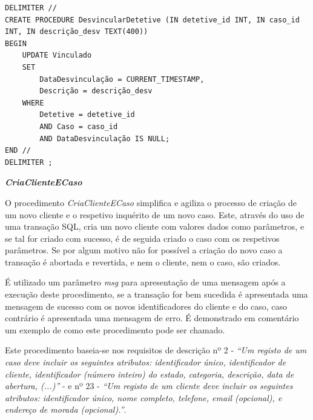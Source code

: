 \documentclass[a4paper,12pt]{scrreprt}
\begin{document}
\vspace{0.4cm}
\begin{lstlisting}[escapechar=!]
DELIMITER //
CREATE PROCEDURE DesvincularDetetive (IN detetive_id INT, IN caso_id INT, IN descrição_desv TEXT(400))
BEGIN
    UPDATE Vinculado
    SET
        DataDesvinculação = CURRENT_TIMESTAMP,
        Descrição = descrição_desv
    WHERE
        Detetive = detetive_id
        AND Caso = caso_id
        AND DataDesvinculação IS NULL;
END //
DELIMITER ;
\end{lstlisting}

\clearpage

\textit{\textbf{CriaClienteECaso}}

O procedimento \textit{CriaClienteECaso} simplifica e agiliza o processo de criação de um novo cliente e o respetivo inquérito de um novo caso. Este, através do uso de uma transação SQL, cria um novo cliente com valores dados como parâmetros, e se tal for criado com sucesso, é de seguida criado o caso com os respetivos parâmetros. Se por algum motivo não for possível a criação do novo caso a transação é abortada e revertida, e nem o cliente, nem o caso, são criados.

É utilizado um parâmetro \textit{msg} para apresentação de uma mensagem após a execução deste procedimento, se a transação for bem sucedida é apresentada uma mensagem de sucesso com os novos identificadores do cliente e do caso, caso contrário é apresentada uma mensagem de erro. É demonstrado em comentário um exemplo de como este procedimento pode ser chamado.

Este procedimento baseia-se nos requisitos de descrição nº 2 - \textit{“Um registo de um caso deve incluir os seguintes atributos: identificador único, identificador de cliente, identificador (número inteiro) do estado, categoria, descrição, data de abertura, (...)”} - e nº 23 - \textit{“Um registo de um cliente deve incluir os seguintes atributos: identificador único, nome completo, telefone, email (opcional), e endereço de morada (opcional).”}.

\clearpage
\end{document}
